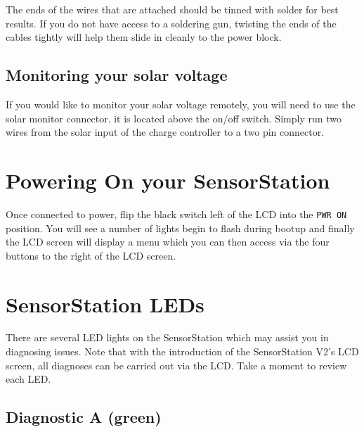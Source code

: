 \documentclass[
]{article}
\begin{document}
The ends of the wires that are attached should be tinned with solder for
best results. If you do not have access to a soldering gun, twisting the
ends of the cables tightly will help them slide in cleanly to the power
block.

\hypertarget{monitoring-your-solar-voltage}{%
\subsection{Monitoring your solar
voltage}\label{monitoring-your-solar-voltage}}

If you would like to monitor your solar voltage remotely, you will need
to use the solar monitor connector. it is located above the on/off
switch. Simply run two wires from the solar input of the charge
controller to a two pin connector.

\hypertarget{powering-on-your-sensorstation}{%
\section{Powering On your
SensorStation}\label{powering-on-your-sensorstation}}

Once connected to power, flip the black switch left of the LCD into the
\texttt{PWR\ ON} position. You will see a number of lights begin to
flash during bootup and finally the LCD screen will display a menu which
you can then access via the four buttons to the right of the LCD screen.

\hypertarget{sensorstation-leds}{%
\section{SensorStation LEDs}\label{sensorstation-leds}}

There are several LED lights on the SensorStation which may assist you
in diagnosing issues. Note that with the introduction of the
SensorStation V2's LCD screen, all diagnoses can be carried out via the
LCD. Take a moment to review each LED.

\hypertarget{diagnostic-a-green}{%
\subsection{Diagnostic A (green)}\label{diagnostic-a-green}}
\end{document}
